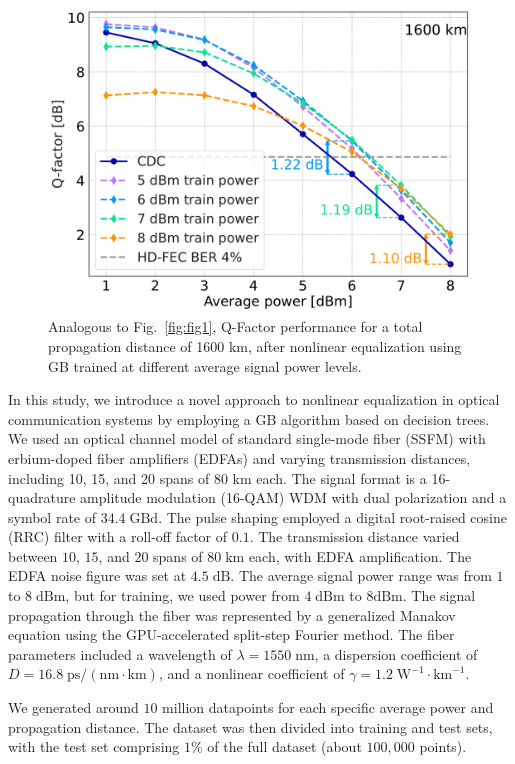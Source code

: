 \begin{figure}[ht]
   \centering
        \includegraphics[width=0.5\linewidth]{images/boost/q_different_models_single.pdf}
    \caption{Analogous to Fig.~\ref{fig:fig1}, Q-Factor performance for a total propagation distance of 1600 km, after nonlinear equalization using GB trained at different average signal power levels.}
    \label{fig:fig2}
\end{figure}

In this study, we introduce a novel approach to nonlinear equalization in optical communication systems by employing a GB algorithm based on decision trees.
We used an optical channel model of standard single-mode fiber (SSFM) with erbium-doped fiber amplifiers (EDFAs) and varying transmission distances, including 10, 15, and 20 spans of 80 km each. The signal format is a 16-quadrature amplitude modulation (16-QAM) WDM with dual polarization and a symbol rate of $34.4\;\textrm{GBd}$. The pulse shaping employed a digital root-raised cosine (RRC) filter with a roll-off factor of $0.1$. The transmission distance varied between $10$, $15$, and $20$ spans of $80\;\textrm{km}$ each, with EDFA amplification. The EDFA noise figure was set at $4.5\;\textrm{dB}$. The average signal power range was from $1$ to $8\;\textrm{dBm}$, but for training, we used power from $4\;\textrm{dBm}$ to $8 \textrm{dBm}$. The signal propagation through the fiber was represented by a generalized Manakov equation using the GPU-accelerated split-step Fourier method\cite{esf0_2023_7880552}. The fiber parameters included a wavelength of $\lambda = 1550\;\textrm{nm}$, a dispersion coefficient of $D = 16.8\;\textrm{ps}/(\textrm{nm} \cdot \textrm{km})$, and a nonlinear coefficient of $\gamma = 1.2\;\textrm{W}^{-1} \cdot \textrm{km}^{-1}$.

We generated around $10$ million datapoints for each specific average power and propagation distance. The dataset was then divided into training and test sets, with the test set comprising $1\%$ of the full dataset (about $100,000$ points).

